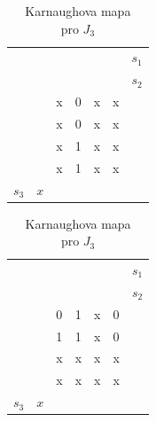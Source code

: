 \begin{table}[!htb]
\begin{minipage}{.5\linewidth}
      \caption{Karnaughova mapa\\ pro $K_2$}
      \centering
    \begin{tabular}{lllllll}
      			       &       					 &       				 & \colorbox{yellow}{} &	\colorbox{yellow}{}&         &$s_1$ \\
    		 	       &        					&\colorbox{red}{}        & \colorbox{red}{}    & 				      &         &$s_2$     \\
    		 	       &        					& x   				 & 0    				   & x     				& x       &  \\
              	       & \colorbox{black}{}       & x     				 & 0    				   & x   		  			& x       &  \\
\colorbox{blue}{}& \colorbox{black}{}       & x    				 & 1     				   & x     				& x       &  \\
\colorbox{blue}{}&       					 & x   				 & 1				  	   & x    					& x       &  \\
    	  $ s_3$ 	& $x$  					&     				 &       				   &       				  	 &          &  \\
    \end{tabular}%
  \end{minipage}%
    \begin{minipage}{.5\linewidth}
      \centering
        \caption{Karnaughova mapa\\ pro $J_3$}
    \begin{tabular}{lllllll}
      			       &       					 &       				 & \colorbox{yellow}{} &	\colorbox{yellow}{}&         &$s_1$ \\
    		 	       &        					&\colorbox{red}{}        & \colorbox{red}{}    & 				      &         &$s_2$     \\
    		 	       &        					& 0    				 & 1    				   & x     				& 0       &  \\
              	       & \colorbox{black}{}       & 1     				 & 1    				   & x   		  			& 0       &  \\
\colorbox{blue}{}& \colorbox{black}{}       & x    				 & x     				   & x     				& x       &  \\
\colorbox{blue}{}&       					 & x   				 & x				  	   & x    					& x       &  \\
    	  $ s_3$ 	& $x$  					&     				 &       				   &       				  	 &          &  \\
    \end{tabular}%
  \end{minipage} 

   
  \label{tab:addlabel}%
\end{table}%


